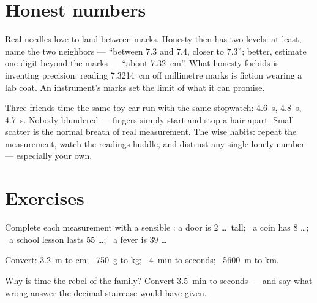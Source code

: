 \section{Honest numbers}

\begin{remark}\label{rem:g6:measurement-in-science:between}
Real needles love to land between marks. Honesty then has two
levels: at least, name the two neighbors --- ``between $7.3$ and
$7.4$, closer to $7.3$''; better, estimate one digit beyond the
marks --- ``about \qty{7.32}{cm}''. What honesty forbids is
inventing precision: reading \qty{7.3214}{cm} off millimetre marks
is fiction wearing a lab coat. An instrument's marks set the limit
of what it can promise.
\end{remark}

\begin{example}\label{ex:g6:measurement-in-science:repeat}
Three friends time the same toy car run with the same stopwatch:
\qty{4.6}{s}, \qty{4.8}{s}, \qty{4.7}{s}. Nobody blundered ---
fingers simply start and stop a hair apart. Small scatter is the
normal breath of real measurement. The wise habits: repeat the
measurement, watch the readings huddle, and distrust any single
lonely number --- especially your own.
\end{example}

\section{Exercises}

\begin{exercise}[$\star$]\label{exo:g6:measurement-in-science:1}
Complete each measurement with a sensible : a door is $2$
\dots\ tall; \ a coin has  $8$ \dots; \ a school lesson lasts
$55$ \dots; \ a fever is $39$ \dots
\end{exercise}

\begin{exercise}[$\star$]\label{exo:g6:measurement-in-science:2}
Convert: \qty{3.2}{m} to \unit{cm}; \ \qty{750}{g} to \unit{kg}; \
\qty{4}{min} to seconds; \ \qty{5600}{m} to \unit{km}.
\end{exercise}

\begin{exercise}[$\star$]\label{exo:g6:measurement-in-science:3}
Why is time the rebel of the  family? Convert \qty{3.5}{min}
to seconds --- and say what wrong answer the decimal staircase
would have given.
\end{exercise}

